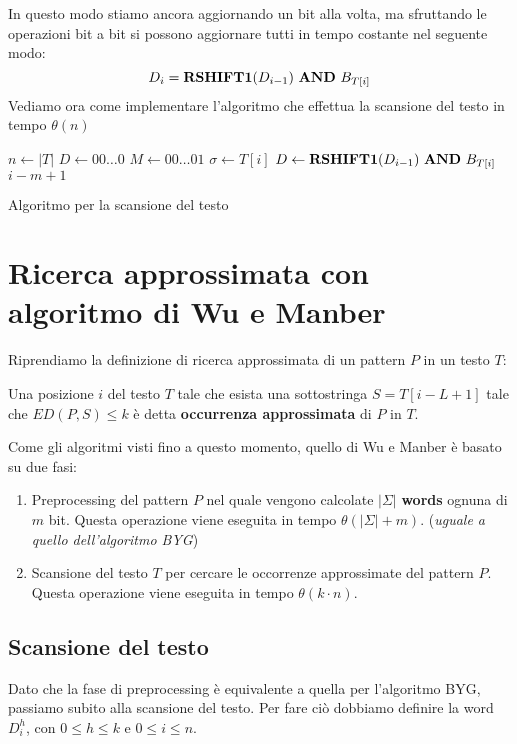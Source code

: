 In questo modo stiamo ancora aggiornando un bit alla volta, ma sfruttando le
operazioni bit a bit si possono aggiornare tutti in tempo costante nel seguente modo:
\begin{equation}
    D_i = \text{\textbf{RSHIFT1}}(D_{i - 1}) \ \text{\textbf{AND}} \ B_{T[i]}
\end{equation}
Vediamo ora come implementare l'algoritmo che effettua la scansione del testo in tempo $\theta(n)$
\begin{algorithm}
    \begin{algorithmic}
        \State $n \gets |T|$
        \State $D \gets 00\dots0$
        \State $M \gets 00\dots01$
        \State $\sigma \gets T[i]$
        \State $D \gets \text{\textbf{RSHIFT1}}(D_{i - 1}) \ \text{\textbf{AND}} \ B_{T[i]}$
        \State {} $i - m + 1$
        \EndIf
        \EndFor
        \EndFunction
    \end{algorithmic}
    \caption{Algoritmo per la scansione del testo}
\end{algorithm}
\section{Ricerca approssimata con algoritmo di Wu e Manber}
Riprendiamo la definizione di ricerca approssimata di un pattern $P$ in un testo $T$:
\begin{definizione}
    Una posizione $i$ del testo $T$ tale che esista una sottostringa $S =T[i - L + 1]$
    tale che $ED(P, S) \leq k$ è detta \textbf{occurrenza approssimata} di $P$ in $T$.
\end{definizione}

Come gli algoritmi visti fino a questo momento, quello di Wu e Manber è basato su due fasi:
\begin{enumerate}
    \item Preprocessing del pattern $P$ nel quale vengono calcolate $|\Sigma|$
          \textbf{words} ognuna di $m$ bit. Questa operazione viene eseguita in tempo
          $\theta(|\Sigma| + m)$. (\textit{uguale a quello dell'algoritmo BYG})
    \item Scansione del testo $T$ per cercare le occorrenze approssimate del pattern $P$.
          Questa operazione viene eseguita in tempo $\theta(k \cdot n)$.
\end{enumerate}
\subsection{Scansione del testo}
Dato che la fase di preprocessing è equivalente a quella per l'algoritmo BYG,
passiamo subito alla scansione del testo. Per fare ciò dobbiamo definire la word
$D_i^h$, con $0 \leq h \leq k$ e $0 \leq i \leq n$.

